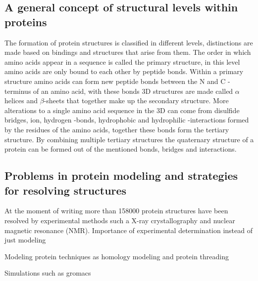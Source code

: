 \subsection{A general concept of structural levels within proteins}

The formation of protein structures is classified in different levels, distinctions are made based on bindings and structures that arise from them. 
The order in which amino acids appear in a sequence is called the primary structure, in this level amino acids are only bound to each other by peptide bonds. 
Within a primary structure amino acids can form new peptide bonds between the N and C -terminus of an amino acid, with these bonds 3D structures are made called $\alpha$ helices and $\beta$-sheets that together make up the secondary structure.
More alterations to a single amino acid sequence in the 3D can come from disulfide bridges, ion, hydrogen -bonds, hydrophobic and hydrophilic -interactions formed by the residues of the amino acids, together these bonds form the tertiary structure.
By combining multiple tertiary structures the quaternary structure of a protein can be formed out of the mentioned bonds, bridges and interactions.

\subsection{Problems in protein modeling and strategies for resolving structures}
At the moment of writing more than 158000 \cite{} protein structures have been resolved by experimental methods such a X-ray crystallography and nuclear magnetic resonance (NMR). 
Importance of experimental determination instead of just modeling

Modeling protein techniques as homology modeling and protein threading

Simulations such as gromacs 